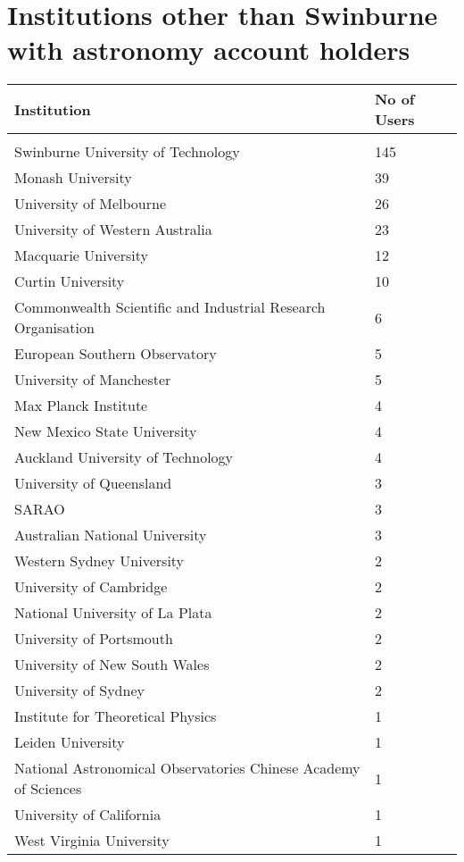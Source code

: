 \documentclass{article}%
\begin{document}
\section{Institutions other than Swinburne with astronomy account holders}%

%
\begin{longtabu}{X[l] X[r]}%
\textbf{Institution}&\textbf{No of Users}\\%
\hline%
&\\%
Swinburne University of Technology&145\\%
\hline%
Monash University&39\\%
\hline%
University of Melbourne&26\\%
\hline%
University of Western Australia&23\\%
\hline%
Macquarie University&12\\%
\hline%
Curtin University&10\\%
\hline%
Commonwealth Scientific and Industrial Research Organisation&6\\%
\hline%
European Southern Observatory&5\\%
\hline%
University of Manchester&5\\%
\hline%
Max Planck Institute&4\\%
\hline%
New Mexico State University&4\\%
\hline%
Auckland University of Technology&4\\%
\hline%
University of Queensland&3\\%
\hline%
SARAO&3\\%
\hline%
Australian National University&3\\%
\hline%
Western Sydney University&2\\%
\hline%
University of Cambridge&2\\%
\hline%
National University of La Plata&2\\%
\hline%
University of Portsmouth&2\\%
\hline%
University of New South Wales&2\\%
\hline%
University of Sydney&2\\%
\hline%
Institute for Theoretical Physics&1\\%
\hline%
Leiden University&1\\%
\hline%
National Astronomical Observatories Chinese Academy of Sciences&1\\%
\hline%
University of California&1\\%
\hline%
West Virginia University&1\\%
\hline%

\end{longtabu}
\end{document}
